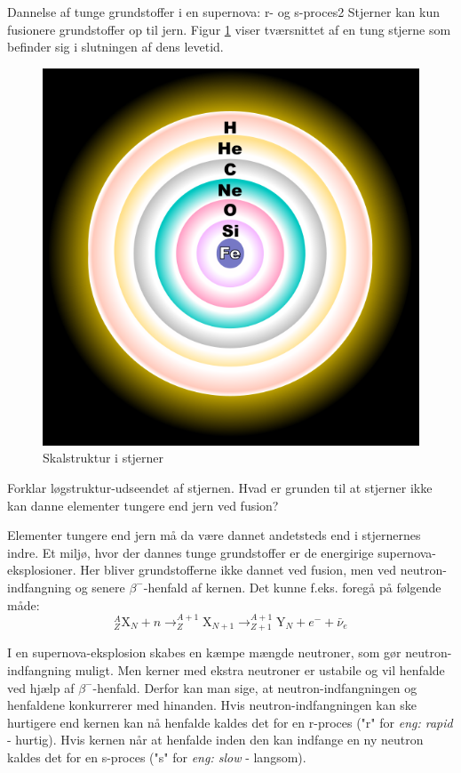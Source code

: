 \begin{opgave}{Dannelse af tunge grundstoffer i en supernova: r- og s-proces}{2}
Stjerner kan kun fusionere grundstoffer op til jern. Figur \ref{fig:fusion} viser tværsnittet af en tung stjerne som befinder sig i slutningen af dens levetid.
\begin{figure}[h]
  \centering
  \includegraphics[scale=0.3]{KernePartikel/fusion.png}
  \caption{Skalstruktur i stjerner}
  \label{fig:fusion}
\end{figure}
\opg Forklar løgstruktur-udseendet af stjernen. Hvad er grunden til at stjerner ikke kan danne elementer tungere end jern ved fusion?

Elementer tungere end jern må da være dannet andetsteds end i stjernernes indre. Et miljø, hvor der dannes tunge grundstoffer er de energirige supernova-eksplosioner. Her bliver grundstofferne ikke dannet ved fusion, men ved neutron-indfangning og senere $\beta^-$-henfald af kernen. Det kunne f.eks. foregå på følgende måde:
\begin{equation*}
^{A}_{Z} \text{X}_{N} + n \rightarrow  ^{A+1}_{Z}\text{X}_{N+1} \rightarrow ^{A+1}_{Z+1}\text{Y}_{N} + e^- + \bar{\nu}_e
\end{equation*}

I en supernova-eksplosion skabes en kæmpe mængde neutroner, som gør neutron-indfangning muligt. Men kerner med ekstra neutroner er ustabile og vil henfalde ved hjælp af $\beta^-$-henfald. Derfor kan man sige, at neutron-indfangningen og henfaldene konkurrerer med hinanden. Hvis neutron-indfangningen kan ske hurtigere end kernen kan nå henfalde kaldes det for en r-proces ("r" for \emph{eng: rapid} - hurtig). Hvis kernen når at henfalde inden den kan indfange en ny neutron kaldes det for en s-proces ("s" for \emph{eng: slow} - langsom). \\


\end{opgave}
